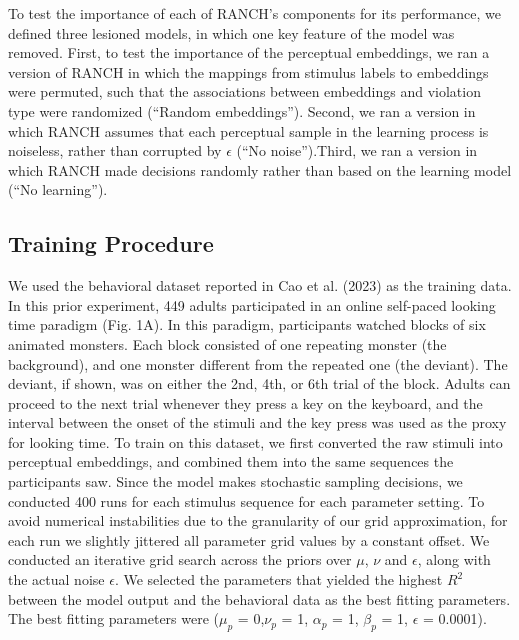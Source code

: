 \documentclass[10pt, letterpaper]{article}
\begin{document}
To test the importance of each of RANCH's components for its
performance, we defined three lesioned models, in which one key feature
of the model was removed. First, to test the importance of the
perceptual embeddings, we ran a version of RANCH in which the mappings
from stimulus labels to embeddings were permuted, such that the
associations between embeddings and violation type were randomized
(``Random embeddings''). Second, we ran a version in which RANCH assumes
that each perceptual sample in the learning process is noiseless, rather
than corrupted by \(\epsilon\) (``No noise'').Third, we ran a version in
which RANCH made decisions randomly rather than based on the learning
model (``No learning'').

\hypertarget{training-procedure}{%
\subsection{Training Procedure}\label{training-procedure}}

We used the behavioral dataset reported in Cao et al. (2023) as the
training data. In this prior experiment, 449 adults participated in an
online self-paced looking time paradigm (Fig. 1A). In this paradigm,
participants watched blocks of six animated monsters. Each block
consisted of one repeating monster (the background), and one monster
different from the repeated one (the deviant). The deviant, if shown,
was on either the 2nd, 4th, or 6th trial of the block. Adults can
proceed to the next trial whenever they press a key on the keyboard, and
the interval between the onset of the stimuli and the key press was used
as the proxy for looking time. To train on this dataset, we first
converted the raw stimuli into perceptual embeddings, and combined them
into the same sequences the participants saw. Since the model makes
stochastic sampling decisions, we conducted 400 runs for each stimulus
sequence for each parameter setting. To avoid numerical instabilities
due to the granularity of our grid approximation, for each run we
slightly jittered all parameter grid values by a constant offset. We
conducted an iterative grid search across the priors over \(\mu\),
\(\nu\) and \(\epsilon\), along with the actual noise \(\epsilon\). We
selected the parameters that yielded the highest \(R^2\) between the
model output and the behavioral data as the best fitting parameters. The
best fitting parameters were (\(\mu_{p}\) = 0,\(\nu_{p}\) = 1,
\(\alpha_{p}\) = 1, \(\beta_{p}\) = 1, \(\epsilon\) = 0.0001).
\end{document}

